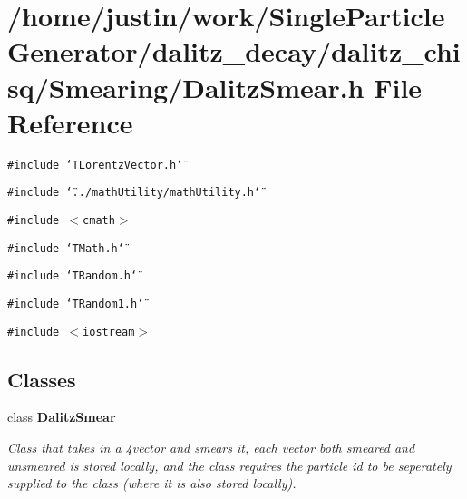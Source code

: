 \section{/home/justin/work/Single\-Particle\-Generator/dalitz\_\-decay/dalitz\_\-chisq/Smearing/Dalitz\-Smear.h File Reference}
\label{DalitzSmear_8h}
{\tt \#include \char`\"{}TLorentz\-Vector.h\char`\"{}}\par
{\tt \#include \char`\"{}../math\-Utility/math\-Utility.h\char`\"{}}\par
{\tt \#include $<$cmath$>$}\par
{\tt \#include \char`\"{}TMath.h\char`\"{}}\par
{\tt \#include \char`\"{}TRandom.h\char`\"{}}\par
{\tt \#include \char`\"{}TRandom1.h\char`\"{}}\par
{\tt \#include $<$iostream$>$}\par
\subsection*{Classes}
\begin{CompactItemize}
\item 
class \bf{Dalitz\-Smear}
\begin{CompactList}\small\item\em Class that takes in a 4vector and smears it, each vector both smeared and unsmeared is stored locally, and the class requires the particle id to be seperately supplied to the class (where it is also stored locally). \item\end{CompactList}\end{CompactItemize}
